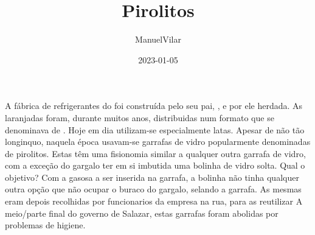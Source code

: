 \documentclass{article}
\title{Pirolitos}
\author{ManuelVilar}
\date{2023-01-05}
\begin{document}
\maketitle

A fábrica de refrigerantes do  foi construída pelo seu pai, , e por ele herdada.
As laranjadas foram, durante muitos anos, distribuidas num formato que se denominava de . Hoje em dia utilizam-se especialmente latas. Apesar de não tão longinquo, naquela época usavam-se garrafas de vidro popularmente denominadas de pirolitos. Estas têm uma fisionomia similar a qualquer outra garrafa de vidro, com a exceção do gargalo ter em si imbutida uma bolinha de vidro solta. Qual o objetivo? 
Com a gasosa a ser inserida na garrafa, a bolinha não tinha qualquer outra opção que não ocupar o buraco do gargalo, selando a garrafa. As mesmas eram depois recolhidas por funcionarios da empresa na rua, para as reutilizar
A meio/parte final do governo de Salazar, estas garrafas foram abolidas por problemas de higiene. 
\printindex
\end{document}
